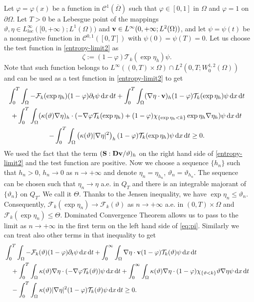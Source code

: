 \documentclass[11pt, a4paper, reqno]{amsart}
\numberwithin{equation}{section}
\newcommand{\dert}{\partial_t}
\newcommand{\vc}[1]{{\bf #1}}
\newcommand{\vv}{\vc{v}}
\newcommand{\thet}{\vartheta}
\renewcommand{\S}{\mathbf{S}}
\newcommand{\D}{\mathbf{D}}
\newcommand{\dt}{\,{\rm d} t }
\newcommand{\dx}{\,{\rm d} {x}}
\newcommand{\dxdt}{\dx  \dt}
\newcommand{\QT}{Q_T}
\newcommand{\intnO}[1]{\int_0^{\infty}\intO{ #1 }\dt}
\newcommand{\intO}[1]{\int_{\Omega} #1 \dx}
\newcommand{\intTO}[1]{\int_0^T \int_{\Omega} #1  \dxdt}
\newcommand{\cF}{\mathcal{F}}
\begin{document}
Let $\varphi=\varphi(x)$ be a function in $\mathcal{C}^1(\overline\Omega)$ such that $\varphi\in[0,1]$ in $\Omega$ and $\varphi=1$ on $\partial \Omega$. Let $T>0$ be a Lebesgue point of the mappings $\thet,\eta\in L^\infty_{loc}([0,+\infty); L^1(\Omega))$ and $\vv\in L^\infty(0,+\infty;L^2(\Omega))$, and let $\psi=\psi(t)$ be a nonnegative function in $\mathcal{C}^{0,1}([0,T])$ with $\psi(0)=\psi(T)=0$. Let us choose the test function in \eqref{entropy-limit2} as
$$
\zeta:=(1-\varphi) \mathcal{T}_k(\exp{\eta_h})\psi.
$$
Note that such function belongs to $L^\infty((0,T)\times\Omega)\cap L^2(0,T;W^{1,2}_0(\Omega))$ and can be used as a test function in \eqref{entropy-limit2} to get
\begin{multline}\label{eq:pi}
  \intTO{-\cF_k(\exp{\eta_h}) (1-\varphi)\dert\psi}+\intTO{(\nabla\eta\cdot \vv)_h (1-\varphi) \mathcal{T}_k(\exp{\eta_h})\psi}\\  + \intTO{(\kappa(\thet)\nabla\eta)_h \cdot(-\nabla\varphi \mathcal{T}_k(\exp{\eta_h})+(1-\varphi) \chi_{\{\exp{\eta_h}<k\}}\exp{\eta_h}\nabla\eta_h)\psi}\\
  -\intTO{\left(\kappa(\thet)|\nabla\eta|^2\right)_h(1-\varphi) \mathcal{T}_k(\exp{\eta_h})\psi}
  \geq 0.
\end{multline}
We used the fact that the term $(\S:\D{\vv}/\thet)_h$ on the right hand side of \eqref{entropy-limit2} and the test function are positive. Now we choose a sequence $\{h_n\}$ such that $h_n>0$, $h_n\to 0$ as $n\to+\infty$ and denote $\eta_n=\eta_{h_n}$, $\thet_n=\thet_{h_n}$. The sequence can be chosen such that $\eta_n\to\eta$ a.e. in $\QT$ and there is an integrable majorant of $\{\thet_n\}$ on $\QT$. We call it $\Theta$. Thanks to the Jensen inequality, we have  $\exp \eta_n\leq \thet_n$. Consequently, $\cF_k(\exp{\eta_n})\to\cF_k(\thet)$ as $n\to+\infty$ a.e. in $(0,T)\times\Omega$ and $\cF_k(\exp{\eta_n})\leq \Theta$. Dominated Convergence Theorem allows us to pass to the limit as $n\to+\infty$ in the first term on the left hand side of \eqref{eq:pi}. Similarly we can treat also other terms in that inequality to get
\begin{equation*}
\begin{aligned}
  &\intTO{-\cF_k(\thet)(1-\varphi)\dert\psi}+\intnO{\nabla\eta\cdot \vv (1-\varphi) \mathcal{T}_k(\thet)\psi}\\  
  &\quad + \intTO{\kappa(\thet)\nabla\eta \cdot(-\nabla\varphi \mathcal{T}_k(\thet))\psi}+\intnO{\kappa(\thet)\nabla\eta \cdot (1-\varphi) \chi_{\{\thet<k\}}\thet\nabla\eta\psi}\\ 
  &\quad  -\intTO{\kappa(\thet)|\nabla\eta|^2(1-\varphi) \mathcal{T}_k(\thet)\psi}\geq 0.
\end{aligned}
\end{equation*}
\end{document}
